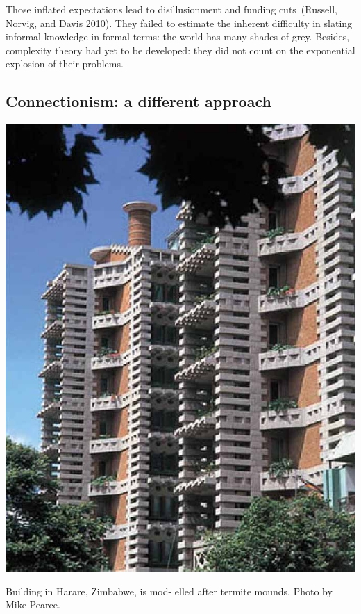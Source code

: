 \documentclass[
  letterpaper,
  12pt,
  british]{tufte-book}
\theoremstyle{plain}
\theoremstyle{definition}
\theoremstyle{plain}
\theoremstyle{remark}
\begin{document}
Those inflated expectations lead to disillusionment and funding
cuts~(Russell, Norvig, and
Davis
2010).
They failed to estimate the inherent difficulty in slating informal
knowledge in formal terms: the world has many shades of grey. Besides,
complexity theory had yet to be developed: they did not count on the
exponential explosion of their problems.

\hypertarget{connectionism-a-different-approach}{%
\subsection{Connectionism: a different
approach}\label{connectionism-a-different-approach}}

\begin{marginfigure}

{\centering \includegraphics{Images/arup_building.jpg}

}

\caption{Building in Harare, Zimbabwe, is mod- elled after termite
mounds. Photo by Mike Pearce.}

\end{marginfigure}
\end{document}
